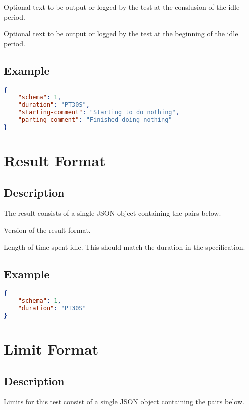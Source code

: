 \documentclass[10pt]{article}
\begin{document}
 Optional text to be output or
logged by the test at the conslusion of the idle period.

 Optional text to be output or
logged by the test at the beginning of the idle period.


\subsection{Example}
\begin{lstlisting}[language=json]
{
    "schema": 1,
    "duration": "PT30S",
    "starting-comment": "Starting to do nothing",
    "parting-comment": "Finished doing nothing"
}
\end{lstlisting}


%
%

\section{Result Format}

\subsection{Description}
The result consists of a single JSON object containing the pairs
below.  \seejson

 Version of the result format.

 Length of time spent idle.  This should
match the duration in the specification.


\subsection{Example}
\begin{lstlisting}[language=json]
{
    "schema": 1,
    "duration": "PT30S"
}
\end{lstlisting}



%
%

\section{Limit Format}

\subsection{Description}
Limits for this test consist of a single JSON object containing the
pairs below.  \seelimit
\end{document}
